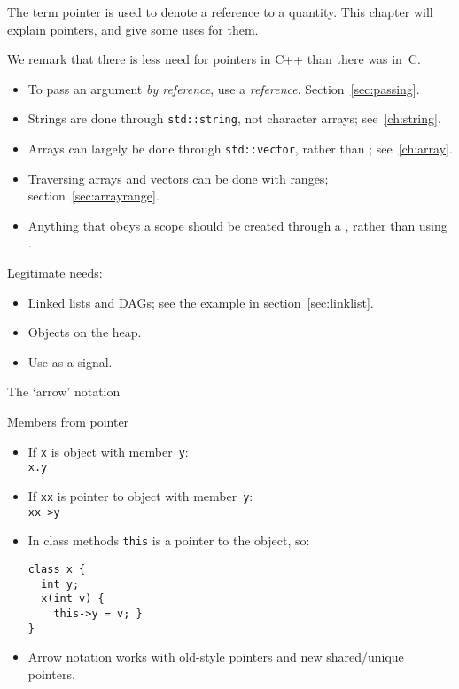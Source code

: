 
The term pointer is used to denote a reference to a quantity.  This
chapter will explain pointers, and give some uses for them.

We remark that there is less need for pointers in C++
than there was in~C.

\begin{itemize}
\item To pass an argument
  \emph{by reference},
  use a \emph{reference}.
  Section~\ref{sec:passing}.
\item Strings are done through \lstinline{std::string}, not character arrays;
  see~\ref{ch:string}.
\item Arrays can largely be done through \lstinline{std::vector}, rather than
  ; see~\ref{ch:array}.
\item Traversing arrays and vectors can be done with ranges;
  section~\ref{sec:arrayrange}.
\item Anything that obeys a scope should be created through a
  , rather than using .
\end{itemize}

Legitimate needs:
\begin{itemize}
\item Linked lists and \acp{DAG}; see the example in section~\ref{sec:linklist}.
\item Objects on the heap.
\item Use  as a signal.
\end{itemize}

 {The `arrow' notation}

\begin{block}{Members from pointer}
  \begin{itemize}
  \item If \lstinline{x} is object with member~\lstinline{y}:\\ \lstinline{x.y}
  \item If \lstinline{xx} is pointer to object with member~\lstinline{y}:\\ \lstinline{xx->y}
  \item In class methods \lstinline{this} is a pointer to the object, so:
\begin{lstlisting}
class x {
  int y;
  x(int v) {
    this->y = v; }
}
\end{lstlisting}
\item Arrow notation works with old-style pointers and new
  shared/unique pointers.
  \end{itemize}
\end{block}

